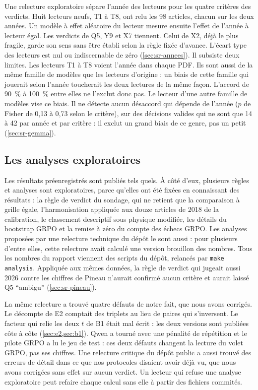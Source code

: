 Une relecture exploratoire sépare l'année des lecteurs pour les quatre critères des
verdicts. Huit lecteurs neufs, T1 à T8, ont relu les 98 articles, chacun sur les deux années. Un modèle à effet aléatoire du lecteur
mesure ensuite l'effet de l'année à lecteur égal. Les verdicts de Q5, Y9 et X7 tiennent. Celui de X2, déjà le
plus fragile, garde son sens sans être établi selon la règle fixée d'avance. L'écart type des
lecteurs est nul ou indiscernable de zéro (\cref{sec:sr-annees}). Il subsiste deux limites. Les
lecteurs T1 à T8 voient l'année dans chaque PDF. Ils sont aussi de la même famille de modèles que les lecteurs
d'origine : un biais de cette famille qui jouerait selon l'année toucherait les deux lectures de la
même façon. L'accord de 90~\% à 100~\% entre elles ne l'exclut donc pas. Le lecteur d'une autre famille
de modèles vise ce biais. Il ne détecte aucun
désaccord qui dépende de l'année ($p$ de Fisher de 0,13 à 0,73 selon le critère), sur des décisions
valides qui ne sont que 14 à 42 par année et par critère : il exclut un grand biais de ce genre, pas
un petit (\cref{sec:sr-gemma}).

\subsection{Les analyses exploratoires}

Les résultats préenregistrés sont publiés tels quels. À côté d'eux, plusieurs règles et analyses
sont exploratoires, parce qu'elles ont été fixées en connaissant des résultats : la règle de verdict
du sondage, qui ne retient que la comparaison à grille égale, l'harmonisation appliquée aux douze
articles de 2018 de la calibration, le classement descriptif sous physique modifiée, les détails du
bootstrap GRPO et la remise à zéro du compte des échecs GRPO. Les analyses proposées par une
relecture technique du dépôt le sont aussi : pour plusieurs d'entre elles, cette relecture avait
calculé une version brouillon des nombres. Tous les nombres du rapport viennent des scripts du
dépôt, relancés par \texttt{make analysis}. Appliquée aux mêmes données, la règle de verdict qui
jugeait aussi 2026 contre les chiffres de Pineau n'aurait confirmé aucun critère et aurait laissé Q5
\enquote{ambigu} (\cref{sec:sr-pineau}).

La même relecture a trouvé quatre défauts de notre fait, que nous avons corrigés. Le décompte de E2
comptait des triplets au lieu de paires qui s'inversent. Le facteur qui relie les deux $t$ de B1
était mal écrit : les deux versions sont publiées côte à côte (\cref{sec:e2,sec:b1}). Qwen a tourné
avec une pénalité de répétition et le pilote GRPO a lu le jeu de test : ces deux défauts changent la
lecture du volet GRPO, pas ses chiffres. Une relecture critique du dépôt public a aussi trouvé des
erreurs de détail dans ce que nos protocoles disaient avoir déjà vu, que nous avons corrigées sans effet sur aucun
verdict. Un lecteur qui refuse une analyse exploratoire peut refaire chaque calcul sans elle à partir
des fichiers commités.

